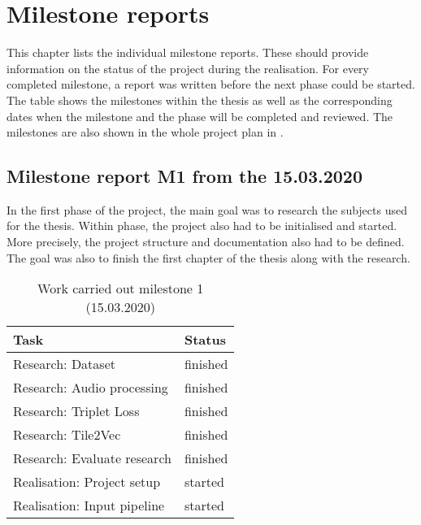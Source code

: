 \chapter{Milestone reports}
\label{app:Milestone-Reports}
This chapter lists the individual milestone reports. These should provide information on the status of the project during the realisation. For every completed milestone, a report was written before the next phase could be started. The table  shows the milestones within the thesis as well as the corresponding dates when the milestone and the phase will be completed and reviewed. The milestones are also shown in the whole project plan in .

\section{Milestone report M1 from the 15.03.2020}
In the first phase of the project, the main goal was to research the subjects used for the thesis. Within phase, the project also had to be initialised and started. More precisely, the project structure and documentation also had to be defined. The goal was also to finish the first chapter of the thesis  along with the research.

\begin{table}[htbp]
    \centering
    \caption{Work carried out milestone 1 (15.03.2020)}
	\label{tab:Work-Carried-Out-M1}
    \begin{tabular}{p{} | p{}}
        \toprule
        \textbf{Task} & \textbf{Status} \\ 
        \midrule[1pt]
        Research: Dataset & finished \\
        \hline
        Research: Audio processing & finished \\
        \hline
        Research: Triplet Loss & finished \\
        \hline
        Research: Tile2Vec & finished \\
        \hline
        Research: Evaluate research & finished \\
        \hline
        Realisation: Project setup & started \\
        \hline
        Realisation: Input pipeline & started \\
        \bottomrule
    \end{tabular}
\end{table}

